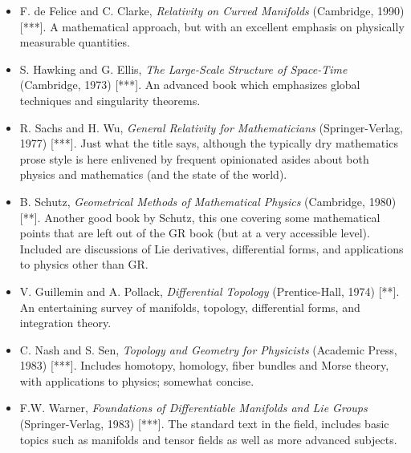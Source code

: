 \documentclass[12pt]{article}
\renewcommand{\thepage}{\roman{page}}
\begin{document}
\begin{itemize}
\item F. de Felice and C. Clarke, {\sl Relativity on Curved Manifolds}
(Cambridge, 1990) [***].  A mathematical approach, but with an excellent
emphasis on physically measurable quantities.

\item S. Hawking and G. Ellis, {\sl The Large-Scale Structure of
Space-Time} (Cambridge, 1973) [***].  An advanced book which emphasizes
global techniques and singularity theorems.

\item R. Sachs and H. Wu, {\sl General Relativity for Mathematicians}
(Springer-Verlag, 1977) [***].  Just what the title says, although the
typically dry mathematics prose style is here enlivened by frequent
opinionated asides about both physics and mathematics (and the state
of the world).

\item B. Schutz, {\sl Geometrical Methods of Mathematical Physics}
(Cambridge, 1980) [**].  Another good book by Schutz, this one covering some
mathematical points that are left out of the GR book (but at a very
accessible level).  Included are
discussions of Lie derivatives, differential forms, and applications to
physics other than GR.

\item V. Guillemin and A. Pollack, {\sl Differential Topology}
(Prentice-Hall, 1974) [**].  An entertaining survey of manifolds, topology,
differential forms, and integration theory.

\item C. Nash and S. Sen, {\sl Topology and Geometry for Physicists}
(Academic Press, 1983) [***].  Includes homotopy, homology, fiber bundles
and Morse theory, with applications to physics; somewhat concise.

\item F.W. Warner, {\sl Foundations of Differentiable Manifolds and
Lie Groups} (Springer-Verlag, 1983) [***].  The standard text in the field,
includes basic topics such as manifolds and tensor fields as well as
more advanced subjects.

\end{itemize}

\eject
\thispagestyle{plain}
\renewcommand{\thepage}{\arabic{page}}
\setcounter{page}{1}
\setcounter{section}{0}
\setcounter{equation}{0}

\end{document}

